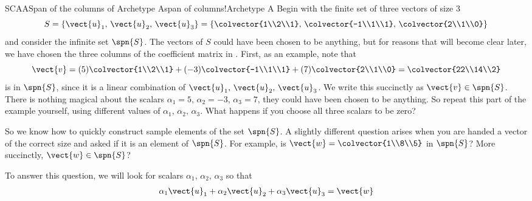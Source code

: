 \begin{example}{SCAA}{Span of the columns of Archetype A}{span of columns!Archetype A}
Begin with the finite set of three vectors of size $3$
%
\begin{equation*}
S=\{\vect{u}_1,\,\vect{u}_2,\,\vect{u}_3\}
=\left\{
\colvector{1\\2\\1},\,\colvector{-1\\1\\1},\,\colvector{2\\1\\0}
\right\}
\end{equation*}
%
and consider the infinite set $\spn{S}$.  The vectors of $S$ could have been chosen to be anything, but for reasons that will become clear later, we have chosen the three columns of the coefficient matrix in .
%
First, as an example, note that
%
\begin{equation*}
\vect{v}=(5)\colvector{1\\2\\1}+(-3)\colvector{-1\\1\\1}+(7)\colvector{2\\1\\0}=
\colvector{22\\14\\2}
\end{equation*}
%
is in $\spn{S}$, since it is a linear combination of $\vect{u}_1,\,\vect{u}_2,\,\vect{u}_3$.  We write this succinctly as $\vect{v}\in\spn{S}$.  There is nothing magical about the scalars $\alpha_1=5,\,\alpha_2=-3,\,\alpha_3=7$, they could have been chosen to be anything.  So repeat this part of the example yourself, using different values of $\alpha_1,\,\alpha_2,\,\alpha_3$.  What happens if you choose all three scalars to be zero?\par
%
So we know how to quickly construct sample elements of the set $\spn{S}$.  A slightly different question arises when you are handed a vector of the correct size and asked if it is an element of $\spn{S}$.  For example, is $\vect{w}=\colvector{1\\8\\5}$ in $\spn{S}$?  More succinctly, $\vect{w}\in\spn{S}$?\par
%
To answer this question, we will look for scalars $\alpha_1,\,\alpha_2,\,\alpha_3$ so that
%
\begin{align*}
\alpha_1\vect{u}_1+\alpha_2\vect{u}_2+\alpha_3\vect{u}_3&=\vect{w}\\

\end{align*}
\end{example}
